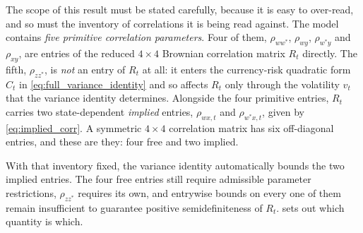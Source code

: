 \documentclass[11pt]{article}
\theoremstyle{definition}
\begin{document}
The scope of this result must be stated carefully, because it is easy to over-read, and so must the inventory of correlations it is being read against. The model contains \emph{five primitive correlation parameters}. Four of them, $\rho_{ww^*}$, $\rho_{wy}$, $\rho_{w^*y}$ and $\rho_{xy}$, are entries of the reduced $4\times4$ Brownian correlation matrix $R_t$ directly. The fifth, $\rho_{zz^*}$, is \emph{not} an entry of $R_t$ at all: it enters the currency-risk quadratic form $C_t$ in \eqref{eq:full_variance_identity} and so affects $R_t$ only through the volatility $v_t$ that the variance identity determines. Alongside the four primitive entries, $R_t$ carries two state-dependent \emph{implied} entries, $\rho_{wx,t}$ and $\rho_{w^*x,t}$, given by \eqref{eq:implied_corr}. A symmetric $4\times4$ correlation matrix has six off-diagonal entries, and these are they: four free and two implied.

With that inventory fixed, the variance identity automatically bounds the two implied entries. The four free entries still require admissible parameter restrictions, $\rho_{zz^*}$ requires its own, and entrywise bounds on every one of them remain insufficient to guarantee positive semidefiniteness of $R_t$.  sets out which quantity is which.
\end{document}

